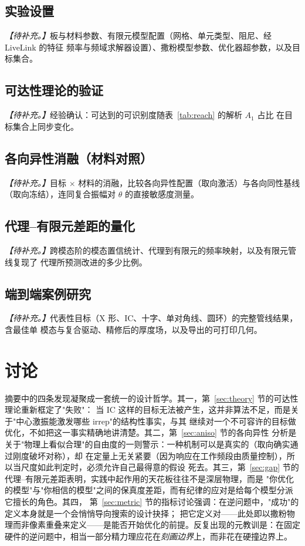 \documentclass[11pt,a4paper]{article}
\newcommand{\Aone}{A_1}
\begin{document}
\subsection{实验设置}
\noindent\textit{【待补充。】}板与材料参数、有限元模型配置（网格、单元类型、阻尼、经 LiveLink 的特征
频率与频域求解器设置）、撒粉模型参数、优化器超参数，以及目标集合。

\subsection{可达性理论的验证}
\noindent\textit{【待补充。】}经验确认：可达到的可识别度随表~\ref{tab:reach} 的解析 $\Aone$ 占比
在目标集合上同步变化。

\subsection{各向异性消融（材料对照）}
\noindent\textit{【待补充。】}目标 $\times$ 材料的消融，比较各向异性配置（取向激活）与各向同性基线
（取向冻结），连同复合振幅对 $\theta$ 的直接敏感度测量。

\subsection{代理--有限元差距的量化}
\noindent\textit{【待补充。】}跨模态阶的模态置信统计、代理到有限元的频率映射，以及有限元管线复现了
代理所预测改进的多少比例。

\subsection{端到端案例研究}
\noindent\textit{【待补充。】}代表性目标（X 形、IC、十字、单对角线、圆环）的完整管线结果，含最佳单
模态与复合驱动、精修后的厚度场，以及导出的可打印几何。

\section{讨论}\label{sec:discussion}

摘要中的四条发现凝聚成一套统一的设计哲学。其一，第~\ref{sec:theory} 节的可达性理论重新框定了"失败"：
当 IC 这样的目标无法被产生，这并非算法不足，而是关于"中心激振能激发哪些 irrep"的结构性事实，与其
继续对一个不可容许的目标做优化，不如把这一事实精确地讲清楚。其二，第~\ref{sec:aniso} 节的各向异性
分析是关于"物理上看似合理"的自由度的一则警示：一种机制可以是真实的（取向确实通过刚度破坏对称），却
在定量上无关紧要（因为响应在工作频段由质量控制），所以当尺度如此判定时，必须允许自己最得意的假设
死去。其三，第~\ref{sec:gap} 节的代理--有限元差距表明，实践中起作用的天花板往往不是深层物理，而是
"你优化的模型"与"你相信的模型"之间的保真度差距，而有纪律的应对是给每个模型分派它擅长的角色。其四，
第~\ref{sec:metric} 节的指标讨论强调：在逆问题中，"成功"的定义本身就是一个会悄悄导向搜索的设计抉择；
把它定义对------此处即以撒粉物理而非像素重叠来定义------是能否开始优化的前提。反复出现的元教训是：在固定
硬件的逆问题中，相当一部分精力理应花在\emph{刻画边界}上，而非花在硬撞边界上。
\end{document}
